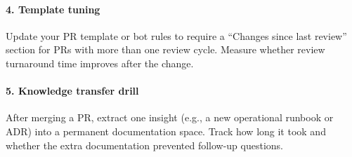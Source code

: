 \paragraph{4. Template tuning} Update your PR template or bot rules to require a ``Changes since last review'' section for PRs with more than one review cycle. Measure whether review turnaround time improves after the change.

\paragraph{5. Knowledge transfer drill} After merging a PR, extract one insight (e.g., a new operational runbook or ADR) into a permanent documentation space. Track how long it took and whether the extra documentation prevented follow-up questions.

